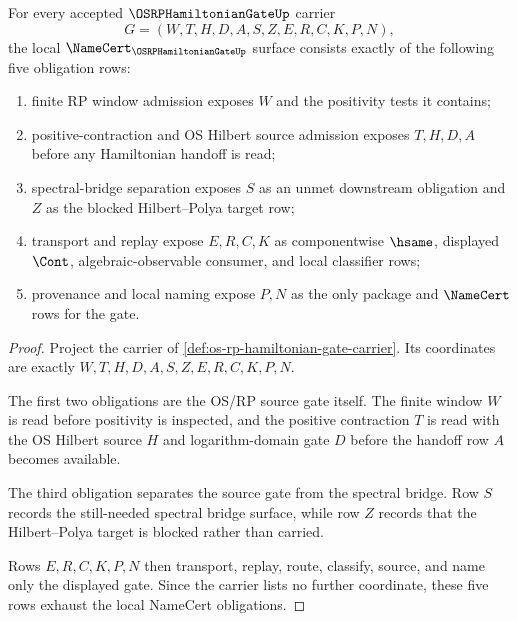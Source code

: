 \begin{theorem}
\label{thm:os-rp-hamiltonian-gate-namecert-obligations}
For every accepted $\OSRPHamiltonianGateUp$ carrier
$$
G=(W,T,H,D,A,S,Z,E,R,C,K,P,N),
$$
the local $\NameCert_{\OSRPHamiltonianGateUp}$ surface consists exactly of the following five obligation rows:
\begin{enumerate}
\item finite RP window admission exposes $W$ and the positivity tests it contains;
\item positive-contraction and OS Hilbert source admission exposes $T,H,D,A$ before any Hamiltonian handoff is read;
\item spectral-bridge separation exposes $S$ as an unmet downstream obligation and $Z$ as the blocked Hilbert--Polya target row;
\item transport and replay expose $E,R,C,K$ as componentwise $\hsame$, displayed $\Cont$, algebraic-observable consumer, and local classifier rows;
\item provenance and local naming expose $P,N$ as the only package and $\NameCert$ rows for the gate.
\end{enumerate}
\end{theorem}
\begin{proof}
Project the carrier of \autoref{def:os-rp-hamiltonian-gate-carrier}. Its coordinates are exactly $W,T,H,D,A,S,Z,E,R,C,K,P,N$.

The first two obligations are the OS/RP source gate itself. The finite window $W$ is read before positivity is inspected, and the positive contraction $T$ is read with the OS Hilbert source $H$ and logarithm-domain gate $D$ before the handoff row $A$ becomes available.

The third obligation separates the source gate from the spectral bridge. Row $S$ records the still-needed spectral bridge surface, while row $Z$ records that the Hilbert--Polya target is blocked rather than carried.

Rows $E,R,C,K,P,N$ then transport, replay, route, classify, source, and name only the displayed gate. Since the carrier lists no further coordinate, these five rows exhaust the local NameCert obligations.
\end{proof}

